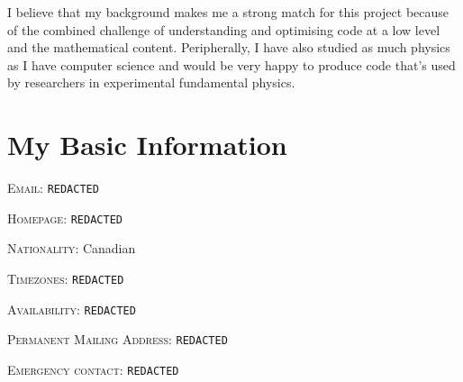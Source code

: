 \documentclass[12pt]{amsart}
\newlength\mystoreparindent
\newenvironment{myparindent}[1]{%
\setlength{\mystoreparindent}{\the\parindent}
\setlength{\parindent}{#1}
}{%
\setlength{\parindent}{\mystoreparindent}
}
\begin{document}
I believe that my background makes me a strong match for this project because of the combined challenge of understanding and optimising code at a low level and the mathematical content. Peripherally, I have also studied as much physics as I have computer science and would be very happy to produce code that's used by researchers in experimental fundamental physics.

\clearpage

\section*{My Basic Information}

\begin{myparindent}{0pt}

\textsc{Email}: \texttt{REDACTED}

\textsc{Homepage}: \texttt{REDACTED}

\textsc{Nationality}: Canadian

\textsc{Timezones}: \texttt{REDACTED}

\textsc{Availability}: \texttt{REDACTED}

\textsc{Permanent Mailing Address}: \texttt{REDACTED}

\textsc{Emergency contact}: \texttt{REDACTED}

\end{myparindent}
\end{document}
